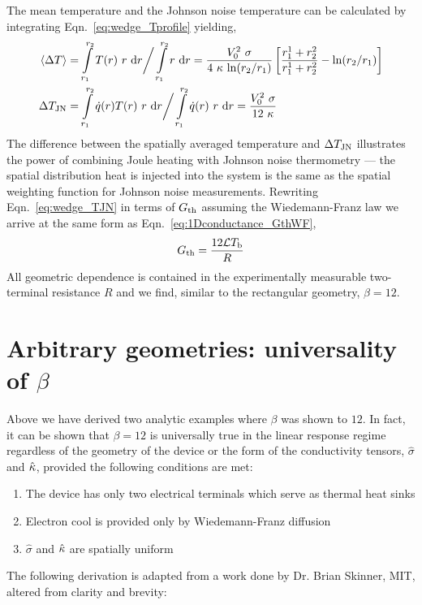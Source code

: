 The mean temperature and the Johnson noise temperature can be calculated by integrating Eqn.~\ref{eq:wedge_Tprofile} yielding,
\begin{align}
\langle\Delta T\rangle &= \int\limits_{r_1}^{r_2}T(r)~r~\mathrm{d}r \bigg/ \int\limits_{r_1}^{r_2}r~\mathrm{d}r =\frac{V_0^2~\sigma}{4~\mathrm{\kappa}~\mathrm{ln}(r_2/r_1)}\left[\frac{r_1^1+r_2^2}{r_1^1+r_2^2}-\mathrm{ln}(r_2/r_1)\right] \\
\Delta T_{\mathrm{JN}} &= \int\limits_{r_1}^{r_2}\dot{q}(r)T(r)~r~\mathrm{d}r \bigg/ \int\limits_{r_1}^{r_2}\dot{q}(r)~r~\mathrm{d}r = \frac{V_0^2~\sigma}{12~\mathrm{\kappa}}\label{eq:wedge_TJN}
\end{align}
The difference between the spatially averaged temperature and $\Delta T_{\mathrm{JN}}$ illustrates the power of combining Joule heating with Johnson noise thermometry --- the spatial distribution heat is injected into the system is the same as the spatial weighting function for Johnson noise measurements. Rewriting Eqn.~\ref{eq:wedge_TJN} in terms of $G_{\mathrm{th}}$ assuming the Wiedemann-Franz law we arrive at the same form as Eqn.~\ref{eq:1Dconductance_GthWF},
\begin{equation}\label{eq:wedge_GthWF}
G_{\mathrm{th}} = \frac{12\mathcal{L} T_\mathrm{b}}{R}
\end{equation}
All geometric dependence is contained in the experimentally measurable two-terminal resistance $R$ and we find, similar to the rectangular geometry, $\beta = 12$.

\section{Arbitrary geometries: universality of $\beta$}
Above we have derived two analytic examples where $\beta$ was shown to $12$. In fact, it can be shown that $\beta = 12$ is universally true in the linear response regime regardless of the geometry of the device or the form of the conductivity tensors, $\hat\sigma$ and $\hat{\mathrm{\kappa}}$, provided the following conditions are met:
\begin{enumerate}
\item The device has only two electrical terminals which serve as thermal heat sinks
\item Electron cool is provided only by Wiedemann-Franz diffusion
\item $\hat\sigma$ and $\hat{\mathrm{\kappa}}$ are spatially uniform
\end{enumerate}
The following derivation is adapted from a work done by Dr. Brian Skinner, MIT, altered from clarity and brevity:

